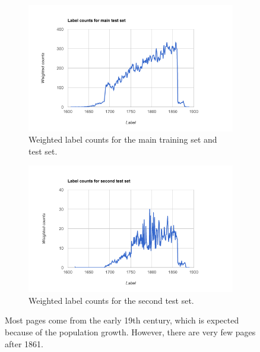 
\begin{figure}
    \centering
    \begin{subfigure}[c]{1.0\textwidth}
        \centering    \includegraphics[scale=0.7]{resources/label_counts.png}
        \caption{Weighted label counts for the main training set and test set.}
    \end{subfigure}
    
    \begin{subfigure}[c]{1.0\textwidth}
        \centering
        \includegraphics[scale=0.7]{resources/label_counts_sec.png}
        \caption{Weighted label counts for the second test set.}
    \end{subfigure}
    
    \caption{Most pages come from the early 19th century, which is expected because of the population growth. However, there are very few pages after 1861.}
    \label{fig:label_counts}
\end{figure}
